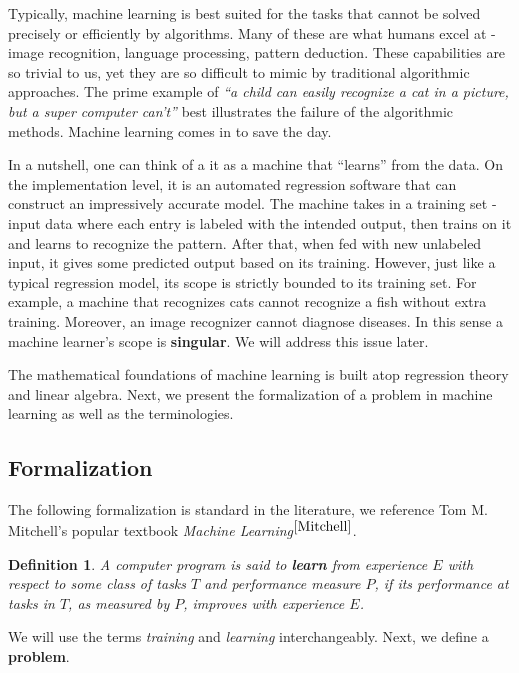 \documentclass[12pt]{article}  %
\newtheorem{definition}{Definition}
\begin{document}
Typically, machine learning is best suited for the tasks that cannot be solved precisely or efficiently by algorithms. Many of these are what humans excel at - image recognition, language processing, pattern deduction. These capabilities are so trivial to us, yet they are so difficult to mimic by traditional algorithmic approaches. The prime example of {\em ``a child can easily recognize a cat in a picture, but a super computer can't''} best illustrates the failure of the algorithmic methods. Machine learning comes in to save the day.

In a nutshell, one can think of a it as a machine that ``learns'' from the data. On the implementation level, it is an automated regression software that can construct an impressively accurate model. The machine takes in a training set - input data where each entry is labeled with the intended output, then trains on it and learns to recognize the pattern. After that, when fed with new unlabeled input, it gives some predicted output based on its training. However, just like a typical regression model, its scope is strictly bounded to its training set. For example, a machine that recognizes cats cannot recognize a fish without extra training. Moreover, an image recognizer cannot diagnose diseases. In this sense a machine learner's scope is {\bf singular}. We will address this issue later.

The mathematical foundations of machine learning is built atop regression theory and linear algebra. Next, we present the formalization of a problem in machine learning as well as the terminologies.








\subsection{Formalization}

The following formalization is standard in the literature, we reference Tom M. Mitchell's popular textbook {\em Machine Learning}$^{\ref{Mitchell}}$.


\begin{definition}
A computer program is said to {\bf \em learn} from experience $E$ with respect to some class of tasks $T$ and performance measure $P$, if its performance at tasks in $T$, as measured by $P$, improves with experience $E$.
\end{definition}

We will use the terms {\em training} and {\em learning} interchangeably. Next, we define a {\bf problem}.
\end{document}
